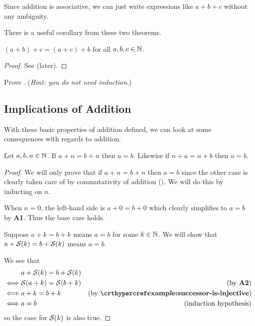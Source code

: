 Since addition is associative, we can just write expressions like $a + b + c$ without any ambiguity.

There is a useful corollary from these two theorems.

\begin{corollary}\label{corollary:right-commutativity-of-addition}
    $(a + b) + c = (a + c) + b$ for all $a, b, c \in \mathbb{N}$.
\end{corollary}
\begin{proof}
    See  (later).
\end{proof}

\begin{exercise}\label{exercise:right-commutativity-of-addition}
    Prove .\newline
    (\textit{Hint: you do not need induction.})
\end{exercise}

\subsection{Implications of Addition}
With these basic properties of addition defined, we can look at some consequences with regards to addition.

\begin{proposition}\label{prop:addition-cancellation-property}
    Let $a, b, n \in \mathbb{N}$. If $a + n = b + n$ then $a = b$. Likewise if $n + a = n + b$ then $a = b$.
\end{proposition}
\begin{proof}
    We will only prove that if $a + n = b + n$ then $a = b$ since the other case is clearly taken care of by commutativity of addition (). We will do this by inducting on $n$.

    When $n = 0$, the left-hand side is $a + 0 = b + 0$ which clearly simplifies to $a = b$ by \textbf{A1}. Thus the base case holds.

    Suppose $a + k = b + k$ means $a = b$ for some $k \in \mathbb{N}$. We will show that $a + {\mathcal{S}(k)} = b + {\mathcal{S}(k)}$ means $a = b$.

    We see that
    \begin{align*}
        &a + \Successor{k} = b + \Successor{k}\\
        \iff& \Successor{a + k} = \Successor{b + k} & (\text{by \textbf{A2}})\\
        \iff& a + k = b + k & (\text{by \myref{example:successor-is-injective}})\\
        \iff& a = b &(\text{induction hypothesis})
    \end{align*}
    so the case for ${\mathcal{S}(k)}$ is also true.
\end{proof}

